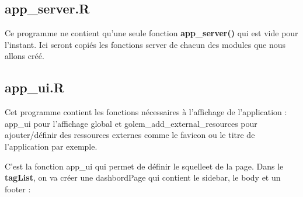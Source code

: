 \documentclass[
  letterpaper,
  DIV=11,
  numbers=noendperiod]{scrreprt}
\begin{document}
\hypertarget{app_server.r}{%
\subsection{app\_server.R}\label{app_server.r}}

Ce programme ne contient qu'une seule fonction \textbf{app\_server()}
qui est vide pour l'instant. Ici seront copiés les fonctions server de
chacun des modules que nous allons créé.

\hypertarget{app_ui.r}{%
\subsection{app\_ui.R}\label{app_ui.r}}

Cet programme contient les fonctions nécessaires à l'affichage de
l'application : app\_ui pour l'affichage global et
golem\_add\_external\_resources pour ajouter/définir des ressources
externes comme le favicon ou le titre de l'application par exemple.

C'est la fonction app\_ui qui permet de définir le squelleet de la page.
Dans le \textbf{tagList}, on va créer une dashbordPage qui contient le
sidebar, le body et un footer :
\end{document}
